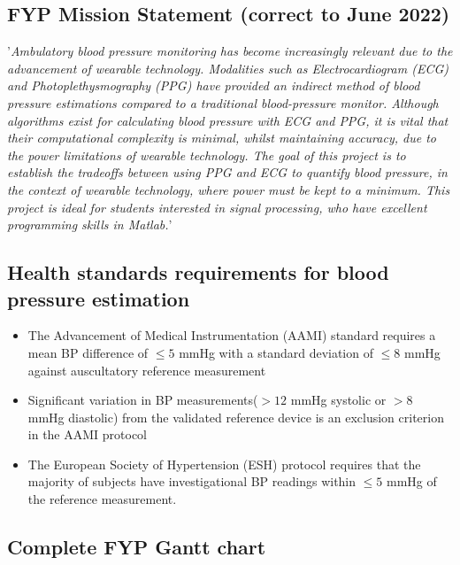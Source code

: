 \subsection*{FYP Mission Statement (correct to June 2022)}
'\emph{Ambulatory blood pressure monitoring has become increasingly 
relevant due to the advancement of wearable technology. 
Modalities such as Electrocardiogram (ECG) and Photoplethysmography 
(PPG) have provided an indirect method of blood pressure estimations 
compared to a traditional blood-pressure monitor. Although algorithms 
exist for calculating blood pressure with ECG and PPG, it is vital 
that their computational complexity is minimal, whilst maintaining 
accuracy, due to the power limitations of wearable technology. The 
goal of this project is to establish the tradeoffs between using 
PPG and ECG to quantify blood pressure, in the context of wearable
 technology, where power must be kept to a minimum. This project is
  ideal for students interested in signal processing, who have 
  excellent programming skills in Matlab.}'


\subsection*{Health standards requirements for blood pressure estimation}
\begin{itemize}
    \item The Advancement of Medical Instrumentation (AAMI) standard requires a mean BP difference of $\le 5$ mmHg with a standard deviation of $\le 8$ mmHg against auscultatory reference measurement
    \item Significant variation in BP measurements($> 12$ mmHg systolic or $> 8$ mmHg diastolic) from the validated reference device is an exclusion criterion in the AAMI protocol \cite{Bard2019}
    \item The European Society of Hypertension (ESH) protocol requires that the majority of subjects have investigational BP readings within $\le 5$ mmHg of the reference measurement.
\end{itemize}

\subsection*{Complete FYP Gantt chart}

